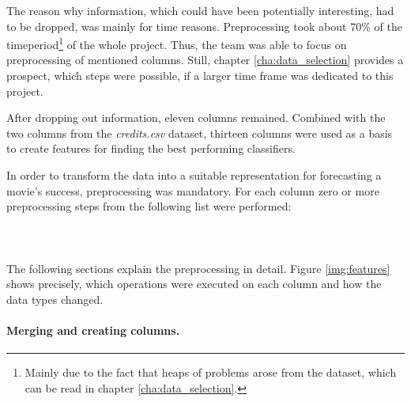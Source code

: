 The reason why information, which could have been potentially interesting, had to be dropped, was mainly for time reasons. Preprocessing took about 70\% of the timeperiod\footnote{Mainly due to the fact that heaps of problems arose from the dataset, which can be read in chapter \ref{cha:data_selection}.} of the whole project. Thus, the team was able to focus on preprocessing of mentioned columns. Still, chapter \ref{cha:data_selection} provides a prospect, which steps were possible, if a larger time frame was dedicated to this project.

After dropping out information, eleven columns remained. Combined with the two columns from the \textit{credits.csv} dataset, thirteen columns were used as a basis to create features for finding the best performing classifiers.

In order to transform the data into a suitable representation for forecasting a movie's success, preprocessing was mandatory. For each column zero or more preprocessing steps from the following list were performed:
\\ \\
\\ \\
The following sections explain the preprocessing in detail. Figure \ref{img:features} shows precisely, which operations were executed on each column and how the data types changed.


\paragraph{Merging and creating columns.}
\label{sec:merge_create}



